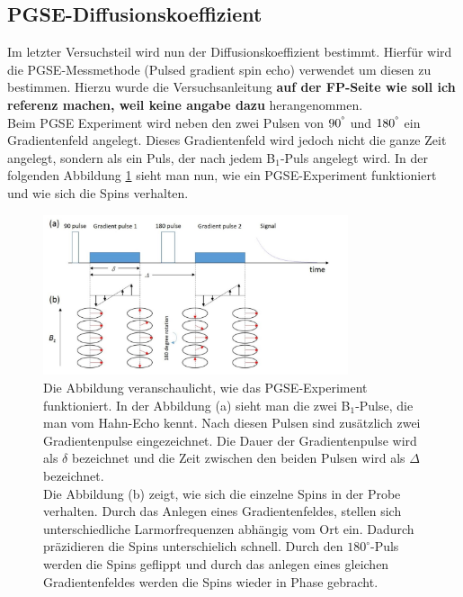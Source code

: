 \subsection{PGSE-Diffusionskoeffizient}
Im letzter Versuchsteil wird nun der Diffusionskoeffizient bestimmt. Hierfür wird die PGSE-Messmethode (Pulsed gradient spin echo) verwendet um diesen zu bestimmen.
Hierzu wurde die Versuchsanleitung \textbf{auf der FP-Seite wie soll ich referenz machen, weil keine angabe dazu} herangenommen.\\
Beim PGSE Experiment wird neben den zwei Pulsen von $90^{\degree}$ und $180^{\degree}$ ein Gradientenfeld angelegt.
Dieses Gradientenfeld wird jedoch nicht die ganze Zeit angelegt, sondern als ein Puls, der nach jedem B$_1$-Puls angelegt wird.
In der folgenden Abbildung \ref{fig:PGSE} sieht man nun, wie ein PGSE-Experiment funktioniert und wie sich die Spins verhalten. 

\begin{figure}[H]
    \centering
    \includegraphics[width=0.8\textwidth]{Abbildungen/PGSE.JPG}
    \caption{Die Abbildung veranschaulicht, wie das PGSE-Experiment funktioniert.
    In der Abbildung (a) sieht man die zwei B$_1$-Pulse, die man vom Hahn-Echo kennt. Nach diesen Pulsen sind zusätzlich zwei Gradientenpulse eingezeichnet. Die Dauer der Gradientenpulse wird als $\delta$ bezeichnet und die Zeit zwischen den beiden Pulsen wird als $\Delta$ bezeichnet.\\
    Die Abbildung (b) zeigt, wie sich die einzelne Spins in der Probe verhalten. Durch das Anlegen eines Gradientenfeldes, stellen sich unterschiedliche Larmorfrequenzen abhängig vom Ort ein. Dadurch präzidieren die Spins unterschielich schnell. Durch den $180^{\circ}$-Puls werden die Spins geflippt und durch das anlegen eines gleichen Gradientenfeldes werden die Spins wieder in Phase gebracht.   
    \cite{literaturPGSE}}
    \label{fig:PGSE}
\end{figure}

